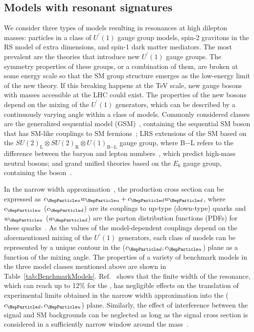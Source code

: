 \documentclass[11pt,twoside,a4paper,cmspaper,final,collab]{cms-tdr}
\begin{document}
\subsection{Models with resonant signatures}
We consider three types of models resulting in resonances at high dilepton masses: \PZpr particles in a class of $U^\prime(1)$ gauge group models, spin-2 gravitons in the RS model of extra dimensions, and spin-1 dark matter mediators. The most prevalent are the theories that introduce new  $U^\prime(1)$ gauge groups. The symmetry properties of these groups, or a combination of them, are broken at some energy scale so that the SM group structure emerges as the low-energy limit of the new theory. If this breaking happens at the TeV scale, new gauge bosons \PZpr with masses accessible at the LHC could exist. The properties of the new \PZpr bosons depend on the mixing of  the $U^\prime(1)$ generators, which can be described by a continuously varying angle within a class of models.  Commonly considered classes are the generalized sequential model (GSM)~\cite{Accomando:2010fz}, containing the sequential SM boson \ZPSSM that has SM-like couplings to SM fermions~\cite{Altar:1989}; LRS extensions of the SM based on the $SU(2)_\text{L} \otimes SU(2)_\text{R} \otimes U(1)_\text{B$-$L}$ gauge group, where B$-$L refers to the difference between the baryon and lepton numbers~\cite{Accomando:2010fz}, which predict high-mass neutral bosons; and grand unified theories based on the $E_6$ gauge group, containing the \ZPPSI boson~\cite{Leike:1998wr,Zp_PSI_3}. 

In the narrow width approximation~\cite{Accomando:2013sfa}, the \PZpr production cross section can be expressed as $c_\PQu w_\PQu + c_\PQd w_\PQd$, where  $c_\PQu$ ($c_\PQd$) are its couplings to up-type (down-type) quarks and $w_\PQu$ ($w_\PQd$) are the parton distribution functions (PDFs) for these quarks~\cite{Carena:2004xs,Accomando:2010fz}.  As the values of the model-dependent couplings depend on the aforementioned mixing of  the $U^\prime(1)$ generators, each class of models can be represented by a unique contour in the ($c_\PQd, c_\PQu$) plane as a function of the mixing angle.  The properties of a variety of benchmark models in the three model classes mentioned above are shown in Table~\ref{tab:BenchmarkModels}. Ref.~\cite{Accomando:2010fz} shows that the finite width of the resonance, which can reach up to 12\% for the \ZPQ, has negligible effects on the translation of experimental limits obtained in the narrow width approximation into the  ($c_\PQd, c_\PQu$) plane. Similarly, the effect of interference between the signal and SM backgrounds can be neglected as long as the signal cross section is considered in a sufficiently narrow window around the \PZpr mass~\cite{Accomando:2013sfa}.
\end{document}
